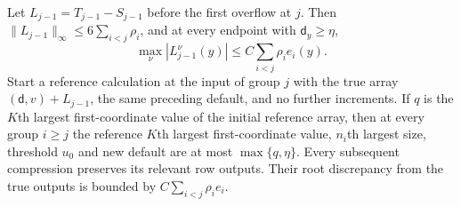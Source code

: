 \begin{lemma}
\label{lem:buf-reference}
Let $L_{j-1}=T_{j-1}-S_{j-1}$ before the first overflow at $j$.
Then $\|L_{j-1}\|_\infty\leq6\sum_{i<j}\rho_i$, and at every endpoint
with $\mathsf{d}_y\geq\eta$,
\begin{equation}
 \max_\nu|L_{j-1}^\nu(y)|
       \leq C\sum_{i<j}\rho_i e_i(y).
 \label{eq:buf-preloss}
\end{equation}
Start a reference calculation at the input of group $j$ with the true
array $(\mathsf{d},v)+L_{j-1}$, the same preceding default, and no further
increments.  If $q$ is the $K$th largest first-coordinate value of the
initial reference array, then at every group $i\ge j$ the reference
$K$th largest first-coordinate value, $n_i$th largest size, threshold $u_0$ and new
default are at most $\max\{q,\eta\}$.  Every subsequent compression
preserves its relevant row outputs.  Their root discrepancy from the true outputs is bounded by
$C\sum_{i<j}\rho_i e_i$.
\end{lemma}
